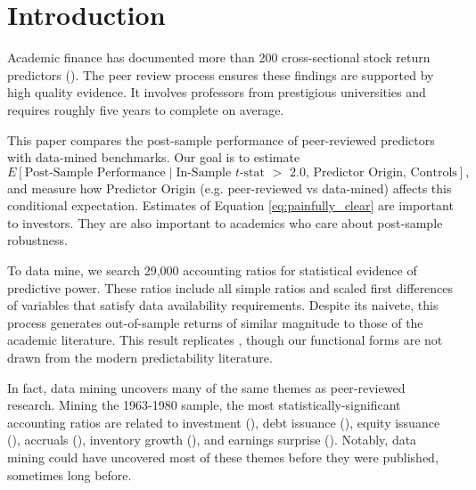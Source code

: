 \section{Introduction}\label{sec:intro}


Academic finance has documented more than 200 cross-sectional stock return predictors (\citealt{ChenZimmermann2021}). The peer review process ensures these findings are supported by high quality evidence. It involves professors from prestigious universities and requires roughly five years to complete on average. 

This paper compares the post-sample performance of peer-reviewed predictors with data-mined benchmarks. Our goal is to estimate
\begin{equation}
	\label{eq:painfully_clear}
	E\left[\text{Post-Sample Performance}  
    \mid
    \text{In-Sample $t$-stat $>$ 2.0, Predictor Origin, Controls}
  \right],
\end{equation}
and measure how Predictor Origin (e.g. peer-reviewed vs data-mined) affects this conditional expectation. Estimates of Equation \eqref{eq:painfully_clear} are important to investors. They are also important to academics who care about post-sample robustness.

To data mine, we search 29,000 accounting ratios for statistical evidence of predictive power. These ratios include all simple ratios and scaled first differences of variables that satisfy data availability requirements. Despite its naivete, this process generates out-of-sample returns of similar magnitude to those of the academic literature. This result replicates \citet{yan2017fundamental}, though our functional forms are not drawn from the modern predictability literature. 

In fact, data mining uncovers many of the same themes as peer-reviewed research. Mining the 1963-1980 sample, the most statistically-significant accounting ratios are related to investment (\citealt{titman2004capital}), debt issuance (\citealt{spiess1999long}), equity issuance (\citealt{loughran1995new}), accruals (\citealt{sloan1996stock}), inventory growth (\citealt{thomas2002inventory}), and earnings surprise (\citealt{watts1978systematic}). Notably, data mining could have uncovered most of these themes before they were published, sometimes long before.

